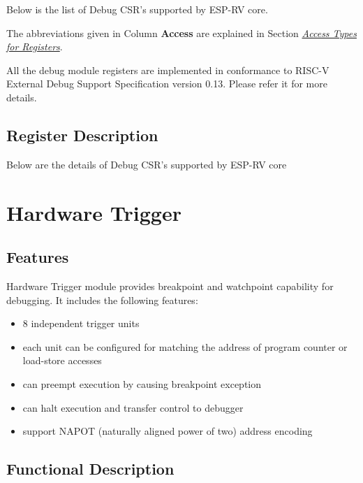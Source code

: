 \documentclass[main\_\_EN.tex]{subfiles}
\begin{document}
Below is the list of Debug CSR's supported by ESP-RV core.

The abbreviations given in Column \textbf{Access} are explained in Section \hyperref[glossary-access-types]{\textit{Access Types for Registers}}.





All the debug module registers are implemented in conformance to RISC-V External Debug Support Specification version 0.13. Please refer it for more details.



\subsection{Register Description}
Below are the details of Debug CSR's supported by ESP-RV core




\clearpage
\section{Hardware Trigger}
\label{sec:riscvcpu-hwt}


\subsection{Features}
\label{sec:riscvcpu-hwt-features}

Hardware Trigger module provides breakpoint and watchpoint capability for debugging. It includes the following features:

\begin{itemize}
    \item 8 independent trigger units
    \item each unit can be configured for matching the address of program counter or load-store accesses
    \item can preempt execution by causing breakpoint exception
    \item can halt execution and transfer control to debugger
    \item support NAPOT (naturally aligned power of two) address encoding
\end{itemize}

\subsection{Functional Description}
\label{sec:riscvcpu-hwt-func-descr}
\end{document}
